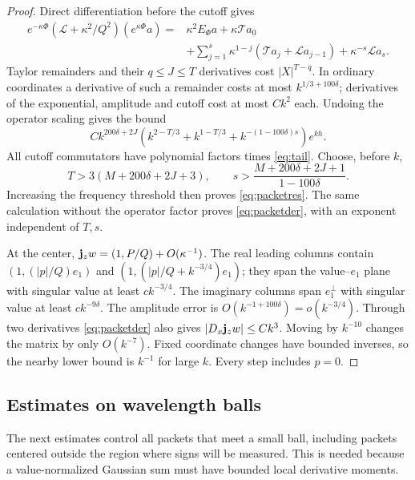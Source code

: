 \begin{proof}
Direct differentiation before the cutoff gives
\[
\begin{split}
 e^{-\kappa\Phi}(\mathcal L+\kappa^2/Q^2)(e^{\kappa\Phi}a)
 ={}&\kappa^2E_\Phi a+\kappa\mathcal T a_0\\
 &+\sum_{j=1}^s\kappa^{1-j}
       (\mathcal T a_j+\mathcal L a_{j-1})
       +\kappa^{-s}\mathcal L a_s .
\end{split}
\]
Taylor remainders and their \(q\le J\le T\) derivatives cost
\(|X|^{T-q}\). In ordinary coordinates a derivative of such a
remainder costs at most \(k^{1/3+100\delta}\);
derivatives of the exponential, amplitude and cutoff cost at
most \(Ck^2\) each. Undoing the operator scaling gives the bound
\begin{equation}\label{eq:accuracy}
 Ck^{200\delta+2J}
 \left(k^{2-T/3}+k^{1-T/3}+k^{-(1-100\delta)s}\right)e^{kh}.
\end{equation}
All cutoff commutators have polynomial factors times \eqref{eq:tail}.
Choose, before \(k\),
\[
 T>3(M+200\delta+2J+3),\qquad
 s>\frac{M+200\delta+2J+1}{1-100\delta}.
\]
Increasing the frequency threshold then proves \eqref{eq:packetres}.
The same calculation without the operator factor proves
\eqref{eq:packetder}, with an exponent independent of \(T,s\).

At the center,
\({\bf j}_z w=(1,P/Q)+O(\kappa^{-1})\).
The real leading columns contain
\((1,(|p|/Q)e_1)\) and
\((1,(|p|/Q+k^{-3/4})e_1)\); they span the value--\(e_1\)
plane with singular value at least \(ck^{-3/4}\).
The imaginary columns span \(e_1^\perp\) with singular value
at least \(ck^{-9\delta}\).
The amplitude error is \(O(k^{-1+100\delta})=o(k^{-3/4})\).
Through two derivatives \eqref{eq:packetder} also gives
\(|D_x{\bf j}_z w|\le Ck^3\). Moving by \(k^{-10}\)
changes the matrix by only \(O(k^{-7})\).
Fixed coordinate changes have bounded inverses, so the nearby
lower bound is \(k^{-1}\) for large \(k\).
Every step includes \(p=0\).
\end{proof}

\subsection{Estimates on wavelength balls}

The next estimates control all packets that meet a small ball,
including packets centered outside the region where signs will be
measured. This is needed because a value-normalized Gaussian sum
must have bounded local derivative moments.

